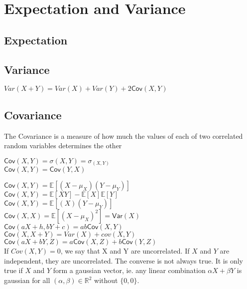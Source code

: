 \section{Expectation and Variance}
\subsection*{Expectation}
\subsection*{Variance}

$Var(X + Y)=Var(X)+Var(Y)+2\textsf{Cov}(X,Y)$
\subsection*{Covariance}

The Covariance is a measure of how much the values of each of two correlated random variables determines the other

$\textsf{Cov}(X,Y) = \sigma(X,Y) = \sigma_ {(X,Y)}$\\

$\textsf{Cov}(X,Y) = \textsf{Cov}(Y,X)$

$\textsf{Cov}(X,Y) = \mathbb E[(X - \mu _ X)(Y - \mu _ Y)]$ \\

$\textsf{Cov}(X,Y) = \mathbb E[XY] - \mathbb E[X]\mathbb E[Y] $\\

$ \textsf{Cov}(X,Y)= \displaystyle  \mathbb E[(X)(Y-\mu _ Y)]$\\

$\textsf{Cov}(X,X) = \mathbb E[(X - \mu _ X)^2] = \textsf{Var}(X)$\\

$\textsf{Cov}(aX + h,bY + c)= ab\textsf{Cov}(X,Y)$\\

$\textsf{Cov}(X,X + Y)= Var(X) + cov(X,Y)$\\

$\displaystyle  \textsf{Cov}(aX+ bY, Z) \displaystyle = a\textsf{Cov}(X,Z) + b\textsf{Cov}(Y,Z)$\\

If $Cov(X,Y) = 0$, we say that X and Y are uncorrelated. If $X$ and $Y$ are independent, they are uncorrelated. The converse is not always true. It is only true if $X$ and $Y$ form a gaussian vector, ie. any linear combination $\alpha X + \beta Y$ is gaussian for all $(\alpha,\beta) \in \mathbb{R}^2$ without $\{0,0\}$.

